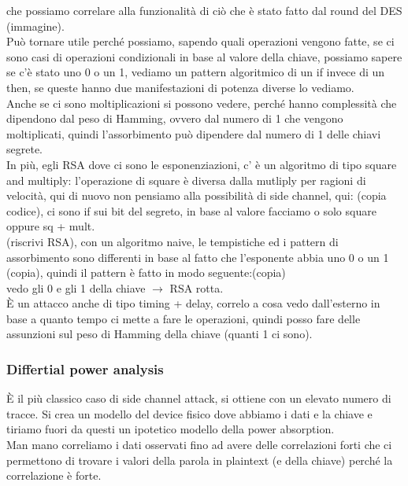 \documentclass[oneside, 12pt]{extbook}
\begin{document}
che possiamo correlare alla funzionalità di ciò che è stato fatto dal round del DES (immagine).\\Può tornare utile perché possiamo, sapendo quali operazioni vengono fatte, se ci sono casi di operazioni condizionali in base al valore della chiave, possiamo sapere se c'è stato uno 0 o un 1, vediamo un pattern algoritmico di un if invece di un then, se queste hanno due manifestazioni di potenza diverse lo vediamo.\\Anche se ci sono moltiplicazioni si possono vedere, perché hanno complessità che dipendono dal peso di Hamming, ovvero dal numero di 1 che vengono moltiplicati, quindi l'assorbimento può dipendere dal numero di 1 delle chiavi segrete.\\In più, egli RSA dove ci sono le esponenziazioni, c' è un algoritmo di tipo square and multiply: l'operazione di square è diversa dalla mutliply per ragioni di velocità, qui di nuovo non pensiamo alla possibilità di side channel, qui: (copia codice), ci sono if sui bit del segreto, in base al valore facciamo o solo square oppure sq + mult.\\(riscrivi RSA), con un algoritmo naive, le tempistiche ed i pattern di assorbimento sono differenti in base al fatto che l'esponente abbia uno 0 o un 1 (copia), quindi il pattern è fatto in modo seguente:(copia)\\vedo gli 0 e gli 1 della chiave $\rightarrow$ RSA rotta.\\È un attacco anche di tipo timing + delay, correlo a cosa vedo dall'esterno in base a quanto tempo ci mette a fare le operazioni, quindi posso fare delle assunzioni sul peso di Hamming della chiave (quanti 1 ci sono).
\subsubsection{Differtial power analysis}
È il più classico caso di side channel attack, si ottiene con un elevato numero di tracce. Si crea un modello del device fisico dove abbiamo i dati e la chiave e tiriamo fuori da questi un ipotetico modello della power absorption.\\Man mano correliamo i dati osservati fino ad avere delle correlazioni forti che ci permettono di trovare i valori della parola in plaintext (e della chiave) perché la correlazione è forte.
\end{document}
